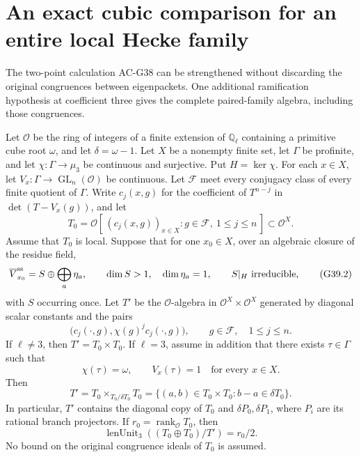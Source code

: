 \section{An exact cubic comparison for an entire local Hecke family}
\label{sec:cubic-family-hecke}

The two-point calculation AC-G38 can be strengthened without discarding
the original congruences between eigenpackets.  One additional
ramification hypothesis at coefficient three gives the complete
paired-family algebra, including those congruences.

\begin{theorem}
\label{AC-G39}
Let $\mathcal O$ be the ring of integers of a finite extension of
$\mathbb Q_\ell$ containing a primitive cube root $\omega$, and let
$\delta=\omega-1$.  Let $X$ be a nonempty finite set, let $\Gamma$
be profinite, and let $\chi:\Gamma\to\mu_3$ be continuous and
surjective.  Put $H=\ker\chi$.  For each $x\in X$, let
$V_x:\Gamma\to\operatorname{GL}_n(\mathcal O)$ be continuous.
Let $\mathcal F$ meet every conjugacy class of every finite quotient
of $\Gamma$.  Write $c_j(x,g)$ for the coefficient of $T^{n-j}$ in
$\det(T-V_x(g))$, and let
\[
 T_0=\mathcal O[\,(c_j(x,g))_{x\in X}:g\in\mathcal F,\ 1\le j\le n\,]
                    \subset\mathcal O^X.                    \tag{G39.1}
\]
Assume that $T_0$ is local.  Suppose that for one $x_0\in X$,
over an algebraic closure of the residue field,
\[
 \overline V_{x_0}^{\rm ss}=S\oplus\bigoplus_a\eta_a,
 \qquad \dim S>1,\quad \dim\eta_a=1,
 \qquad S|_H\text{ irreducible},                            \tag{G39.2}
\]
with $S$ occurring once.  Let $T'$ be the $\mathcal O$-algebra
in $\mathcal O^X\times\mathcal O^X$ generated by diagonal scalar
constants and the pairs
\[
           \bigl(c_j(\cdot,g),\chi(g)^j c_j(\cdot,g)\bigr),
                  \qquad g\in\mathcal F,\quad 1\le j\le n.
                                                               \tag{G39.3}
\]
If $\ell\ne3$, then $T'=T_0\times T_0$.
If $\ell=3$, assume in addition that there exists $\tau\in\Gamma$
such that
\[
              \chi(\tau)=\omega,
              \qquad V_x(\tau)=1\quad\text{for every }x\in X.
                                                               \tag{G39.4}
\]
Then
\[
 T'=T_0\times_{T_0/\delta T_0}T_0
   =\{(a,b)\in T_0\times T_0:b-a\in\delta T_0\}.             \tag{G39.5}
\]
In particular, $T'$ contains the diagonal copy of $T_0$ and
$\delta P_0,\delta P_1$, where $P_i$ are its rational branch
projectors.  If $r_0=\operatorname{rank}_{\mathcal O}T_0$, then
\[
 \operatorname{lenUnit}_3((T_0\oplus T_0)/T')=r_0/2.           \tag{G39.6}
\]
No bound on the original congruence ideals of $T_0$ is assumed.
\end{theorem}
